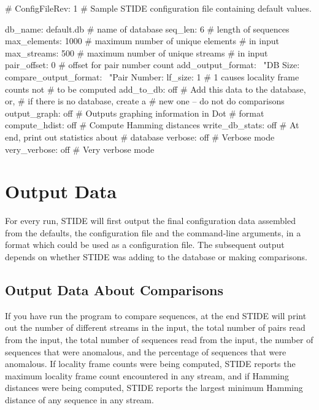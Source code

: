 \documentclass{amsart}
\begin{document}
\vspace{.15in}

\begin{boxedverbatim}

# ConfigFileRev: 1
# Sample STIDE configuration file containing default values.

 db_name: default.db     # name of database
 seq_len: 6              # length of sequences
 max_elements: 1000      # maximum number of unique elements 
			 # in input 
 max_streams: 500        # maximum number of unique streams 
 			 # in input  
 pair_offset: 0          # offset for pair number count
 add_output_format:  \
         "DB Size: %
 compare_output_format:  \
         "Pair Number: %
 lf_size: 1              # 1 causes locality frame counts not
                         # to be computed 
 add_to_db: off          # Add this data to the database, or, 
                         # if there is no database, create a 
                         # new one -- do not do comparisons
 output_graph: off       # Outputs graphing information in Dot
                         # format 
 compute_hdist: off      # Compute Hamming distances
 write_db_stats: off     # At end, print out statistics about 
 			 # database
 verbose: off            # Verbose mode
 very_verbose: off       # Very verbose mode

\end{boxedverbatim}

\section{Output Data} \label{sec:output}
For every run, STIDE will first output the final configuration data
assembled from the defaults, the configuration file and the
command-line arguments, in a format which could be used as a
configuration file. The subsequent output depends on whether STIDE was
adding to the database or making comparisons.

\subsection{Output Data About Comparisons}

If you have run the program to compare sequences, at the end STIDE
will print out the number of different streams in the input, the total
number of pairs read from the input, the total number of sequences
read from the input, the number of sequences that were anomalous, and
the percentage of sequences that were anomalous.  If locality frame
counts were being computed, STIDE reports the maximum locality frame
count encountered in any stream, and if Hamming distances were being
computed, STIDE reports the largest minimum Hamming distance of any
sequence in any stream.
\end{document}
